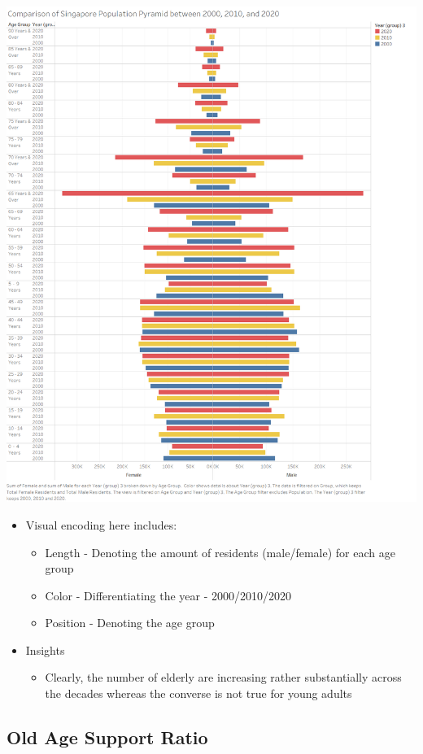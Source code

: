 \documentclass[a4paper, 11pt]{article}
\begin{document}
\begin{center}
\includegraphics[width=.9\linewidth]{./charts/Pyramid.png}
\end{center}

\begin{itemize}
\item Visual encoding here includes:
\begin{itemize}
\item Length - Denoting the amount of residents (male/female) for each age group
\item Color - Differentiating the year - 2000/2010/2020
\item Position - Denoting the age group
\end{itemize}
\item Insights
\begin{itemize}
\item Clearly, the number of elderly are increasing rather substantially across the decades whereas the converse is not true for young adults
\end{itemize}
\end{itemize}
\subsection{Old Age Support Ratio}
\label{sec:org39d2427}
\end{document}

